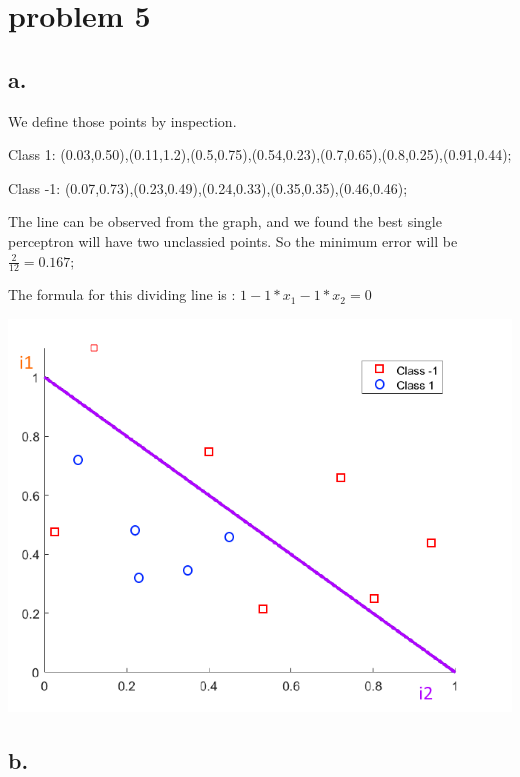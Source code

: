 \documentclass[12pt, letterpaper]{article}
\begin{document}
	\pagebreak
	\section{problem 5}
	\subsection{a.}
	
	We define those points by inspection.
	
	Class 1: (0.03,0.50),(0.11,1.2),(0.5,0.75),(0.54,0.23),(0.7,0.65),(0.8,0.25),(0.91,0.44);
	
	Class -1: (0.07,0.73),(0.23,0.49),(0.24,0.33),(0.35,0.35),(0.46,0.46);
	
	The line can be observed from the graph, and we found the best single perceptron will have two unclassied points. So the minimum error will be
	$\frac{2}{12}= 0.167; $
	
	The formula for this dividing line is : $1-1*x_{1}-1*x_{2}=0$
	
	\includegraphics[scale=0.6]{"problem-5a"}
	
	\subsection{b.}
	
\end{document}

